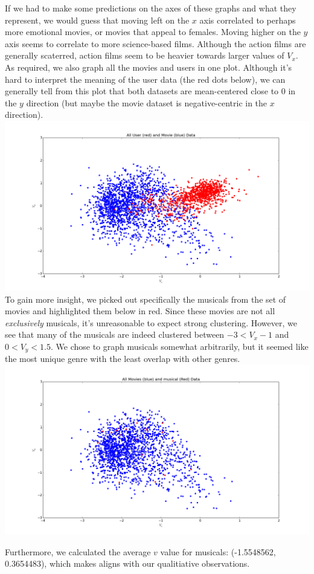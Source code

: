 \documentclass{article}
\begin{document}
If we had to make some predictions on the axes of these graphs and what they
represent, we would guess that moving left on the $x$ axis correlated
to perhaps more emotional movies, or movies that appeal to females. Moving
higher on the $y$ axis seems to correlate to more science-based films. Although
the action films are generally scaterred, action films seem to be heavier
towards larger values of $V_x$.\\

As required, we also graph all the movies and users in one plot. Although
it's hard to interpret the meaning of the user data (the red dots below),
we can generally tell from this plot that both datasets are mean-centered
close to 0 in the $y$ direction (but maybe the movie dataset is negative-centric
in the $x$ direction). \\
\includegraphics[width=1\textwidth]{all_users_movies}
To gain more insight, we picked out specifically the musicals from the set of movies
and highlighted them below in red. Since these movies are not all \textit{exclusively}
musicals, it's unreasonable to expect strong clustering. However, we see that
many of the musicals are indeed clustered between $-3 < V_x -1 $ and $0 < V_y < 1.5$.
We chose to graph musicals somewhat arbitrarily, but it seemed like the most
unique genre with the least overlap with other genres.
\includegraphics[width=1\textwidth]{musical_all_movies}

Furthermore, we calculated the average $v$ value for musicals: (-1.5548562, 0.3654483),
which makes aligns with our qualitiative observations.
\end{document}
